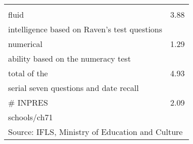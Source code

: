 \begin{table}[htbp]
\begin{tabular}{l*{1}{c}}
                &         \\
\addlinespace
fluid           &     3.88\\
intelligence based on Raven's test questions&         \\
\addlinespace
numerical       &     1.29\\
ability based on the numeracy test&         \\
\addlinespace
total of the    &     4.93\\
serial seven questions and date recall&         \\
\addlinespace
# INPRES        &     2.09\\
schools/ch71    &         \\
\bottomrule
\multicolumn{2}{l}{\footnotesize Source: IFLS, Ministry of Education and Culture}\\
\end{tabular}
\end{table}

